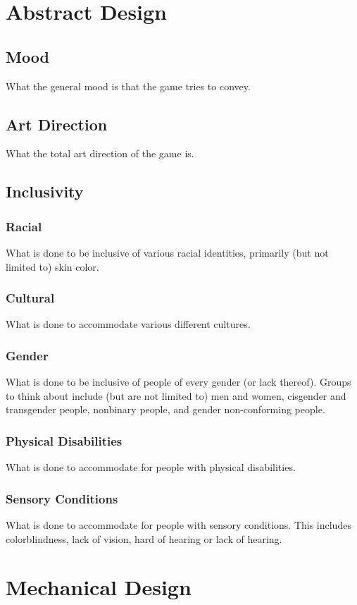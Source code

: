\section{Abstract Design}
\subsection{Mood}
What the general mood is that the game tries to convey.
\subsection{Art Direction}
What the total art direction of the game is.
\subsection{Inclusivity}
\subsubsection{Racial}
What is done to be inclusive of various racial identities, primarily (but not limited to) skin color.
\subsubsection{Cultural}
What is done to accommodate various different cultures.
\subsubsection{Gender}
What is done to be inclusive of people of every gender (or lack thereof). Groups to think about include (but are not limited to) men and women, cisgender and transgender people, nonbinary people, and gender non-conforming people.
\subsubsection{Physical Disabilities}
What is done to accommodate for people with physical disabilities.
\subsubsection{Sensory Conditions}
What is done to accommodate for people with sensory conditions. This includes colorblindness, lack of vision, hard of hearing or lack of hearing.

\section{Mechanical Design}
